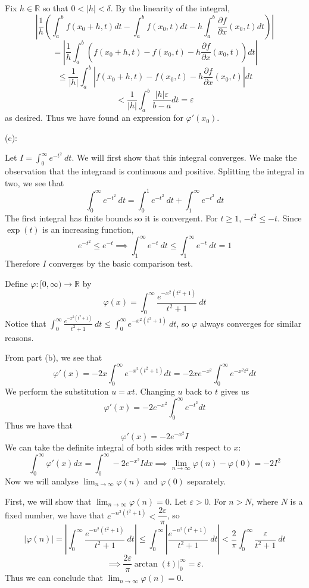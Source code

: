 \documentclass{article}
\theoremstyle{plain} %
\numberwithin{thm}{section} %
\theoremstyle{definition}
\begin{document}
\begin{question}{27}
    Fix \(h \in \mathbb{R}\) so that \(0 < |h| <\delta\). By the linearity of the integral,
    \[
        \left\vert \frac{1}{h} \left(\int _a^b f(x_0 + h,t)dt - \int _a^b f(x_0, t)dt - h\int _a^b \frac{\partial f}{\partial x} (x_0,t)dt\right) \right\vert
    \]
    \[
        = \left\vert\frac{1}{h}\int _a^b (f(x_0 + h, t) - f(x_0, t) - h\frac{\partial f}{\partial x} (x_0,t))dt\right\vert 
    \]
    \[
        \leq \frac{1}{|h|} \int _a^b \left\vert f(x_0 + h, t) - f(x_0, t) - h\frac{\partial f}{\partial x} (x_0,t) \right\vert dt
    \]
    \[
        < \frac{1}{|h|}\int _a^b \frac{|h|\varepsilon}{b-a}dt =\varepsilon
    \]
    as desired. Thus we have found an expression for \(\varphi ' (x_0)\).

    (c):

    Let \(I = \int _0^{\infty} e^{-t^2}\ dt\). We will first show that this integral converges. We make the observation that the integrand is continuous and positive. Splitting the integral in two, we see that
    \[
        \int _0^{\infty} e^{-t^2}\ dt = \int _0^{1} e^{-t^2}\ dt + \int _1^{\infty} e^{-t^2}\ dt
    \]
    The first integral has finite bounds so it is convergent. For \(t \geq 1\), \(-t^2 \leq -t\). Since \(\exp (t)\) is an increasing function,
    \[
        e^{-t^2} \leq e^{-t} \implies \int _1^{\infty} e^{-t}\ dt \leq \int _1^{\infty} e^{-t}\ dt = 1
    \]
    Therefore \(I\) converges by the basic comparison test.
    
    Define \(\varphi : [0,\infty) \to  \mathbb{R}\) by
    \[
        \varphi (x) = \int _0^{\infty} \frac{e^{-x^2(t^2 + 1)}}{t^{2} +1}\ dt
    \]
    Notice that \(\int _0^{\infty} \frac{e^{-x^2(t^2 + 1)}}{t^{2} +1}\ dt \leq \int _0^{\infty} e^{-x^2(t^2 + 1)}\ dt\), so \(\varphi\) always converges for similar reasons.

    From part (b), we see that
    \[
        \varphi '(x) = -2x\int _0^{\infty} e^{-x^2 (t^2 + 1)}dt = -2xe^{-x^2}\int _0^{\infty} e^{-x^2 t^2}dt
    \]
    We perform the substitution \(u = xt\). Changing \(u\) back to \(t\) gives us
    \[
        \varphi '(x) = -2e^{-x^2}\int _0^{\infty} e^{-t^2}dt
    \]
    Thus we have that
    \[
        \varphi '(x) = -2e^{-x^2}I
    \]
    We can take the definite integral of both sides with respect to \(x\):
    \[
        \int _0 ^{\infty} \varphi '(x) dx = \int _0^{\infty} -2e^{-x^2}I dx \implies \lim_{n \to \infty} \varphi (n) - \varphi (0) = -2I^2
    \]
    Now we will analyse \(\lim_{n \to \infty} \varphi (n)\) and \(\varphi (0)\) separately.

    First, we will show that \(\lim_{n \to \infty} \varphi (n) = 0\). Let \(\varepsilon > 0\). For \(n > N\), where \(N\) is a fixed number, we have that \(e^{-n^2(t^2 +1)} < \dfrac{2\varepsilon}{\pi}\), so
    \[
        |\varphi (n)| = \left\vert \int _0^{\infty} \frac{e^{-n^2(t^2 + 1)}}{t^{2} +1}\ dt \right\vert \leq \int _0^{\infty} \left\vert \frac{e^{-n^2(t^2 + 1)}}{t^{2} +1}\ dt \right\vert < \frac{2}{\pi} \int _0^{\infty} \frac{\varepsilon}{t^2 + 1}\ dt
    \]
    \[
        \implies \frac{2\varepsilon}{\pi} \arctan (t) \Big| _0^{\infty} = \varepsilon.
    \]
    Thus we can conclude that \(\lim_{n \to \infty} \varphi (n) = 0\).


\end{question}
\end{document}
